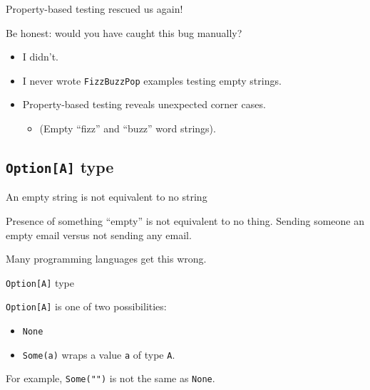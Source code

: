 
\begin{frame}[fragile]{Property-based testing rescued us again!}
  \begin{block}{Be honest: would you have caught this bug manually?}
    \begin{itemize}
    \item I didn't.
    \item I never wrote \texttt{FizzBuzzPop} examples testing empty strings.
    \item Property-based testing reveals \alert{unexpected} corner cases.
      \begin{itemize}
      \item (Empty ``fizz'' and ``buzz'' word strings).
      \end{itemize}
    \end{itemize}
  \end{block}
\end{frame}

\subsection{\texttt{Option[A]} type}

\begin{frame}{An empty string is \alert{not} equivalent to no string}
  \begin{block}{Presence of something ``empty'' is \alert{not} equivalent to no thing.}
    Sending someone an empty email versus not sending any email.
  \end{block}
  
  Many programming languages get this wrong.
\end{frame}

\begin{frame}[fragile]{\texttt{Option[A]} type}

  \texttt{Option[A]} is one of two possibilities:
  \begin{itemize}
  \item \texttt{None}
  \item \texttt{Some(a)} wraps a value \texttt{a} of type \texttt{A}.
  \end{itemize}

  For example, \texttt{Some("")} is not the same as \texttt{None}.

  \inputminted{scala}{OptionExample1.scala}
\end{frame}

